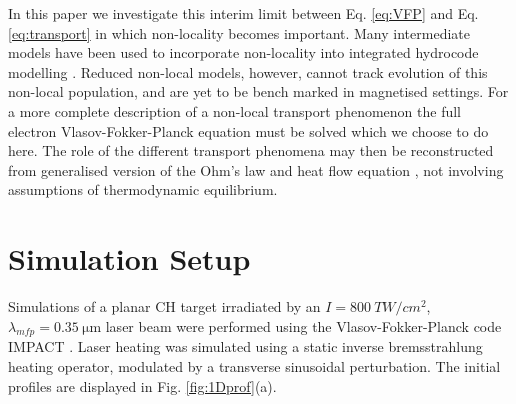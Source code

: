 \documentclass[aip,reprint]{revtex4-1}
\begin{document}
 In this paper we investigate this interim limit between Eq. \ref{eq:VFP} and Eq. \ref{eq:transport} in which non-locality becomes important. Many intermediate models have been used to incorporate non-locality into integrated hydrocode modelling \cite{Schurtz2000,Nicolai2006a,Manheimer2008}. Reduced non-local models, however, cannot track evolution of this non-local population, and are yet to be bench marked in magnetised settings.  For a more complete description of a non-local transport phenomenon the full electron Vlasov-Fokker-Planck equation must be solved which we choose to do here.  The role of the different transport phenomena may then be reconstructed from generalised version of the Ohm's law and heat flow equation \cite{Luciani1983} \cite{Williams2013}, not involving assumptions of thermodynamic equilibrium. 


% 


\section{Simulation Setup}
\label{sec:simulationsetup}
Simulations of a planar CH target irradiated by an $I = \SI{800}{TW/cm^2}$, $\lambda_{mfp} = \SI{0.35}{\micro\meter}$ laser beam were performed using the Vlasov-Fokker-Planck code IMPACT \cite{Kingham2002}. Laser heating was simulated using a static inverse bremsstrahlung heating operator, modulated by a transverse sinusoidal perturbation. The initial profiles are displayed in Fig. \ref{fig:1Dprof}(a).
\end{document}
